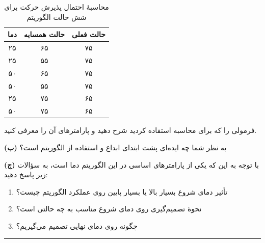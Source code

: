 \documentclass[a4paper,10pt]{article}
\begin{document}
\begin{table}[h]
\centering
\begin{tabular}{|c|c|c|}
\hline
\textbf{دما} & \textbf{حالت همسایه} & \textbf{حالت فعلی} \\
\hline
۲۵ & ۶۵ & ۷۵ \\
\hline
۲۵ & ۵۵ & ۷۵ \\
\hline
۵۰ & ۶۵ & ۷۵ \\
\hline
۵۰ & ۵۵ & ۷۵ \\
\hline
۲۵ & ۷۵ & ۶۵ \\
\hline
۵۰ & ۷۵ & ۶۵ \\
\hline
\end{tabular}
\caption{محاسبهٔ احتمال پذیرش حرکت برای شش حالت الگوریتم}
\end{table}

فرمولی را که برای محاسبه استفاده کردید شرح دهید و پارامترهای آن را معرفی کنید.

\bigskip
    
\noindent\textbf{(ب)} به نظر شما چه ایده‌ای پشت ابتدای ابداع و استفاده از الگوریتم  است؟

\bigskip

\noindent\textbf{(ج)} با توجه به این که یکی از پارامترهای اساسی در این الگوریتم دما است،  
به سؤالات زیر پاسخ دهید:

\begin{enumerate}
  \item تأثیر دمای شروع بسیار بالا یا بسیار پایین روی عملکرد الگوریتم چیست؟
  \item نحوهٔ تصمیم‌گیری روی دمای شروع مناسب به چه حالتی است؟
  \item چگونه روی دمای نهایی تصمیم می‌گیریم؟
\end{enumerate}

\rule{\linewidth}{0.4pt}
\end{document}
